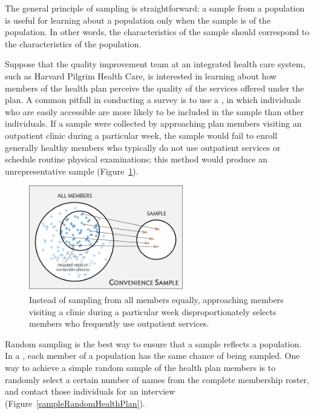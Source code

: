 The general principle of sampling is straightforward: a sample from a population is useful for learning about a population only when the sample is  of the population. In other words, the characteristics of the sample should correspond to the characteristics of the population. 

Suppose that the quality improvement team at an integrated health care system, such as Harvard Pilgrim Health Care, is interested in learning about how members of the health plan perceive the quality of the services offered under the plan. A common pitfall in conducting a survey is to use a , in which individuals who are easily accessible are more likely to be included in the sample than other individuals. If a sample were collected by approaching plan members visiting an outpatient clinic during a particular week, the sample would fail to enroll generally healthy members who typically do not use outpatient services or schedule routine physical examinations; this method would produce an unrepresentative sample (Figure~\ref{sampleConvenienceHealthPlan}). 


\begin{figure}[h]
	\centering
	\includegraphics[width=0.6\textwidth]{ch_01a_intro_to_data_oi_biostat/figures/sampleHealthPlan/sampleConvenienceHealthPlan.png}
	\caption{Instead of sampling from all members equally, approaching members visiting a clinic during a particular week disproportionately selects members who frequently use outpatient services.}
	\label{sampleConvenienceHealthPlan}
\end{figure}


Random sampling is the best way to ensure that a sample reflects a population. In a , each member of a population has the same chance of being sampled. One way to achieve a simple random sample of the health plan members is to randomly select a certain number of names from the complete membership roster, and contact those individuals for an interview (Figure~\ref{sampleRandomHealthPlan}). 


